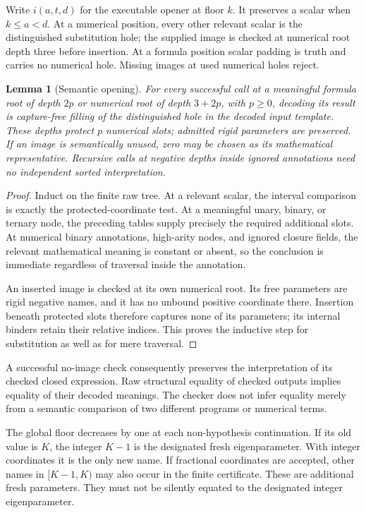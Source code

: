 \documentclass[11pt,letterpaper]{article}
\newtheorem{lemma}[theorem]{Lemma}
\theoremstyle{definition}\newtheorem{definition}[theorem]{Definition}
\theoremstyle{remark}\newtheorem{remark}[theorem]{Remark}
\begin{document}
Write $i(a,t,d)$ for the executable opener at floor $k$.  It preserves a
scalar when $k\leq a<d$.  At a numerical position, every other relevant
scalar is the distinguished substitution hole; the supplied image is
checked at numerical root depth three before insertion.  At a formula
position scalar padding is truth and carries no numerical hole.
Missing images at used numerical holes reject.

\begin{lemma}[Semantic opening]
\label{lem:semantic-opening}
For every successful call at a meaningful formula root of depth $2p$
or numerical root of depth $3+2p$, with $p\geq0$, decoding its result
is capture-free filling of the distinguished hole in the decoded input
template.  These depths protect $p$ numerical slots; admitted rigid
parameters are preserved.  If an image is semantically unused, zero
may be chosen as its mathematical representative.  Recursive calls
at negative depths inside ignored annotations need no independent
sorted interpretation.
\end{lemma}

\begin{proof}
Induct on the finite raw tree.  At a relevant scalar, the interval
comparison is exactly the protected-coordinate test.  At a meaningful
unary, binary, or ternary node, the preceding tables supply precisely
the required additional slots.  At numerical binary annotations,
high-arity nodes, and ignored closure fields, the relevant mathematical
meaning is constant or absent, so the conclusion is immediate
regardless of traversal inside the annotation.

An inserted image is checked at its own numerical root.  Its free
parameters are rigid negative names, and it has no unbound positive
coordinate there.  Insertion beneath protected slots therefore captures
none of its parameters; its internal binders retain their relative
indices.  This proves the inductive step for substitution as well as
for mere traversal.
\end{proof}

A successful no-image check consequently preserves the interpretation
of its checked closed expression.  Raw structural equality of checked
outputs implies equality of their decoded meanings.  The checker does
not infer equality merely from a semantic comparison of two different
programs or numerical terms.

The global floor decreases by one at each non-hypothesis continuation.
If its old value is $K$, the integer $K-1$ is the designated fresh
eigenparameter.  With integer coordinates it is the only new name.
If fractional coordinates are accepted, other names in $[K-1,K)$ may
also occur in the finite certificate.  These are additional fresh
parameters.  They must not be silently equated to the designated
integer eigenparameter.
\end{document}
